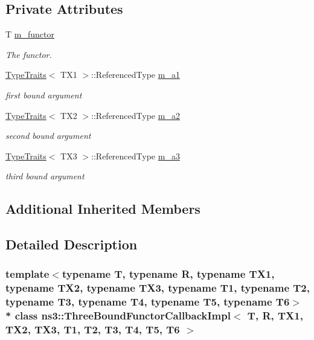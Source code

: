 \subsection*{Private Attributes}
\begin{DoxyCompactItemize}
\item 
T \hyperlink{classns3_1_1ThreeBoundFunctorCallbackImpl_aba0b9eaf53ed5db5aa306e883cadf8e8}{m\+\_\+functor}
\begin{DoxyCompactList}\small\item\em The functor. \end{DoxyCompactList}\item 
\hyperlink{structTypeTraits}{Type\+Traits}$<$ T\+X1 $>$\+::Referenced\+Type \hyperlink{classns3_1_1ThreeBoundFunctorCallbackImpl_a0151665b6a1866a0ea061c54801e4445}{m\+\_\+a1}
\begin{DoxyCompactList}\small\item\em first bound argument \end{DoxyCompactList}\item 
\hyperlink{structTypeTraits}{Type\+Traits}$<$ T\+X2 $>$\+::Referenced\+Type \hyperlink{classns3_1_1ThreeBoundFunctorCallbackImpl_acf64a084798b9a6aacefba19f259c562}{m\+\_\+a2}
\begin{DoxyCompactList}\small\item\em second bound argument \end{DoxyCompactList}\item 
\hyperlink{structTypeTraits}{Type\+Traits}$<$ T\+X3 $>$\+::Referenced\+Type \hyperlink{classns3_1_1ThreeBoundFunctorCallbackImpl_a9f44c80b9158946d5d321e3e28e3dc5e}{m\+\_\+a3}
\begin{DoxyCompactList}\small\item\em third bound argument \end{DoxyCompactList}\end{DoxyCompactItemize}
\subsection*{Additional Inherited Members}


\subsection{Detailed Description}
\subsubsection*{template$<$typename T, typename R, typename T\+X1, typename T\+X2, typename T\+X3, typename T1, typename T2, typename T3, typename T4, typename T5, typename T6$>$\\*
class ns3\+::\+Three\+Bound\+Functor\+Callback\+Impl$<$ T, R, T\+X1, T\+X2, T\+X3, T1, T2, T3, T4, T5, T6 $>$}

